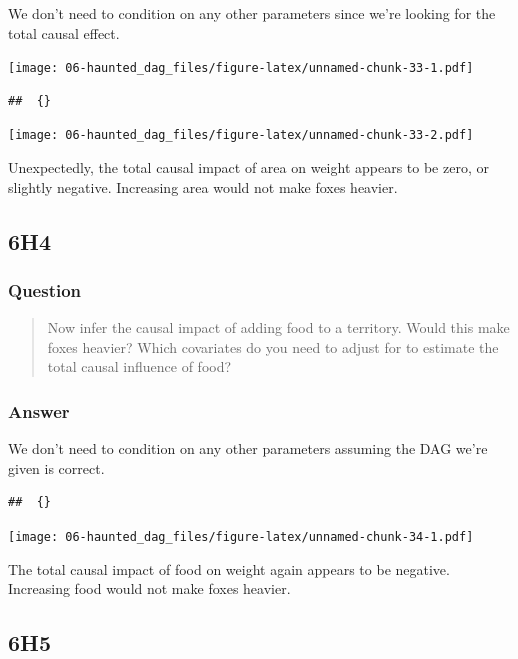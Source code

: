 \documentclass[
]{book}
\begin{document}
We don't need to condition on any other parameters since we're looking for the total causal effect.

\texttt{[image: 06-haunted\_dag\_files/figure-latex/unnamed-chunk-33-1.pdf]}

\begin{verbatim}
##  {}
\end{verbatim}

\texttt{[image: 06-haunted\_dag\_files/figure-latex/unnamed-chunk-33-2.pdf]}

Unexpectedly, the total causal impact of area on weight appears to be zero, or slightly negative. Increasing area would not make foxes heavier.

\hypertarget{h4-2}{%
\subsection*{6H4}\label{h4-2}}

\hypertarget{question-58}{%
\subsubsection*{Question}\label{question-58}}

\begin{quote}
Now infer the causal impact of adding food to a territory. Would this make foxes heavier? Which covariates do you need to adjust for to estimate the total causal influence of food?
\end{quote}

\hypertarget{answer-58}{%
\subsubsection*{Answer}\label{answer-58}}

We don't need to condition on any other parameters assuming the DAG we're given is correct.

\begin{verbatim}
##  {}
\end{verbatim}

\texttt{[image: 06-haunted\_dag\_files/figure-latex/unnamed-chunk-34-1.pdf]}

The total causal impact of food on weight again appears to be negative. Increasing food would not make foxes heavier.

\hypertarget{h5-1}{%
\subsection*{6H5}\label{h5-1}}
\end{document}
